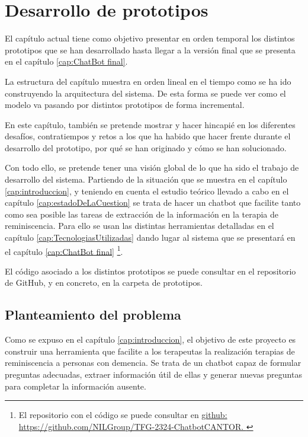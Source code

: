 \chapter{Desarrollo de prototipos}
\label{cap:Desarrollo de prototipos}

El capítulo actual tiene como objetivo presentar en orden temporal los distintos prototipos que se han desarrollado hasta llegar a la versión final que se presenta en el capítulo \ref{cap:ChatBot final}. 

La estructura del capítulo  muestra en orden lineal en el tiempo como se ha ido construyendo la arquitectura del sistema. De esta forma se puede ver como el modelo va pasando por distintos prototipos de forma incremental. 

En este capítulo, también se pretende mostrar y hacer hincapié en los diferentes desafíos, contratiempos y retos a los que ha habido que hacer frente durante el desarrollo del prototipo, por qué se han originado y cómo se han solucionado. 

Con todo ello, se pretende tener una visión global de lo que ha sido el trabajo de desarrollo del sistema. Partiendo de la situación que se muestra en el capítulo \ref{cap:introduccion}, y teniendo en cuenta el estudio teórico llevado a cabo en el capítulo \ref{cap:estadoDeLaCuestion} se trata de hacer un chatbot que facilite tanto como sea posible las tareas de extracción de la información en la terapia de reminiscencia. Para ello se usan las distintas herramientas detalladas en el capítulo \ref{cap:TecnologiasUtilizadas} dando lugar al sistema que se presentará en el capítulo \ref{cap:ChatBot final} \footnote{El repositorio con el código se puede consultar en \href{ GitHub}{github:\\
		https://github.com/NILGroup/TFG-2324-ChatbotCANTOR. }}. 


El código asociado a los distintos prototipos se puede consultar en el repositorio de GitHub, y en concreto, en la carpeta de prototipos. 

\section{Planteamiento del problema}
Como se expuso en el capítulo \ref{cap:introduccion}, el objetivo de este proyecto es construir una herramienta que facilite a los terapeutas la realización terapias de reminiscencia a personas con demencia. Se trata de un chatbot capaz de formular preguntas adecuadas, extraer información útil de ellas y generar nuevas preguntas para completar la información ausente. 

